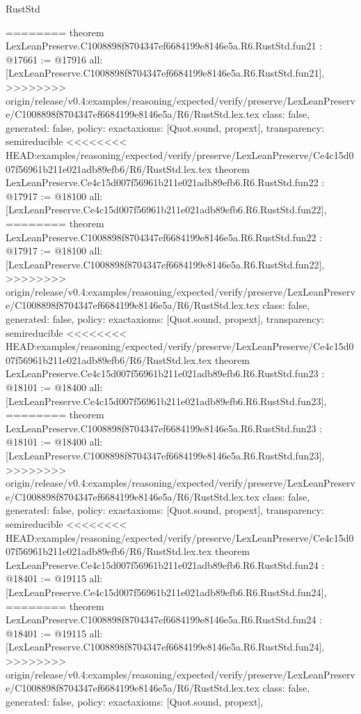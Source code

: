 \begin{lexlean}{RustStd}
\begin{coremodule}
{\begin{coremodule}
{{{{{{{{{{{{{{{{{{{{{{{{========
theorem LexLeanPreserve.C1008898f8704347ef6684199e8146e5a.R6.RustStd.fun21 : @17661 := @17916 {
  all: [LexLeanPreserve.C1008898f8704347ef6684199e8146e5a.R6.RustStd.fun21],
>>>>>>>> origin/release/v0.4:examples/reasoning/expected/verify/preserve/LexLeanPreserve/C1008898f8704347ef6684199e8146e5a/R6/RustStd.lex.tex
  class: false,
  generated: false,
  policy: exact{axioms: [Quot.sound, propext]},
  transparency: semireducible
}
<<<<<<<< HEAD:examples/reasoning/expected/verify/preserve/LexLeanPreserve/Ce4c15d007f56961b211e021adb89efb6/R6/RustStd.lex.tex
theorem LexLeanPreserve.Ce4c15d007f56961b211e021adb89efb6.R6.RustStd.fun22 : @17917 := @18100 {
  all: [LexLeanPreserve.Ce4c15d007f56961b211e021adb89efb6.R6.RustStd.fun22],
========
theorem LexLeanPreserve.C1008898f8704347ef6684199e8146e5a.R6.RustStd.fun22 : @17917 := @18100 {
  all: [LexLeanPreserve.C1008898f8704347ef6684199e8146e5a.R6.RustStd.fun22],
>>>>>>>> origin/release/v0.4:examples/reasoning/expected/verify/preserve/LexLeanPreserve/C1008898f8704347ef6684199e8146e5a/R6/RustStd.lex.tex
  class: false,
  generated: false,
  policy: exact{axioms: [Quot.sound, propext]},
  transparency: semireducible
}
<<<<<<<< HEAD:examples/reasoning/expected/verify/preserve/LexLeanPreserve/Ce4c15d007f56961b211e021adb89efb6/R6/RustStd.lex.tex
theorem LexLeanPreserve.Ce4c15d007f56961b211e021adb89efb6.R6.RustStd.fun23 : @18101 := @18400 {
  all: [LexLeanPreserve.Ce4c15d007f56961b211e021adb89efb6.R6.RustStd.fun23],
========
theorem LexLeanPreserve.C1008898f8704347ef6684199e8146e5a.R6.RustStd.fun23 : @18101 := @18400 {
  all: [LexLeanPreserve.C1008898f8704347ef6684199e8146e5a.R6.RustStd.fun23],
>>>>>>>> origin/release/v0.4:examples/reasoning/expected/verify/preserve/LexLeanPreserve/C1008898f8704347ef6684199e8146e5a/R6/RustStd.lex.tex
  class: false,
  generated: false,
  policy: exact{axioms: [Quot.sound, propext]},
  transparency: semireducible
}
<<<<<<<< HEAD:examples/reasoning/expected/verify/preserve/LexLeanPreserve/Ce4c15d007f56961b211e021adb89efb6/R6/RustStd.lex.tex
theorem LexLeanPreserve.Ce4c15d007f56961b211e021adb89efb6.R6.RustStd.fun24 : @18401 := @19115 {
  all: [LexLeanPreserve.Ce4c15d007f56961b211e021adb89efb6.R6.RustStd.fun24],
========
theorem LexLeanPreserve.C1008898f8704347ef6684199e8146e5a.R6.RustStd.fun24 : @18401 := @19115 {
  all: [LexLeanPreserve.C1008898f8704347ef6684199e8146e5a.R6.RustStd.fun24],
>>>>>>>> origin/release/v0.4:examples/reasoning/expected/verify/preserve/LexLeanPreserve/C1008898f8704347ef6684199e8146e5a/R6/RustStd.lex.tex
  class: false,
  generated: false,
  policy: exact{axioms: [Quot.sound, propext]},
}}}}}}}}}}}}}}}}}}}}}}}}}}}}
\end{coremodule}}
\end{coremodule}
\end{lexlean}
